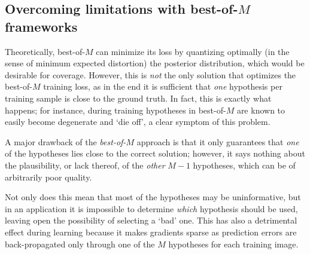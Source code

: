 


\subsection{Overcoming limitations with best-of-$M$ frameworks}

Theoretically, best-of-$M$ can minimize its loss by quantizing optimally (in the sense of minimum expected distortion) the posterior distribution, which would be desirable for coverage.
However, this is \emph{not} the only solution that optimizes the best-of-$M$ training loss, as in the end it is sufficient that \emph{one} hypothesis per training sample is close to the ground truth.
In fact, this is exactly what happens; for instance, during training hypotheses in best-of-$M$ are known to easily become degenerate and `die off', a clear symptom of this problem.

A major drawback of the \emph{best-of-$M$} approach is that it only guarantees that \emph{one} of the hypotheses lies close to the correct solution; however, it says nothing about the plausibility, or lack thereof, of the \emph{other} $M-1$ hypotheses, which can be of arbitrarily poor quality.

Not only does this mean that most of the hypotheses may be uninformative, but in an application it is impossible to determine \emph{which} hypothesis should be used, leaving open the possibility of selecting a `bad' one.
This has also a detrimental effect during learning because it makes gradients sparse as prediction errors are back-propagated only through one of the $M$ hypotheses for each training image.

